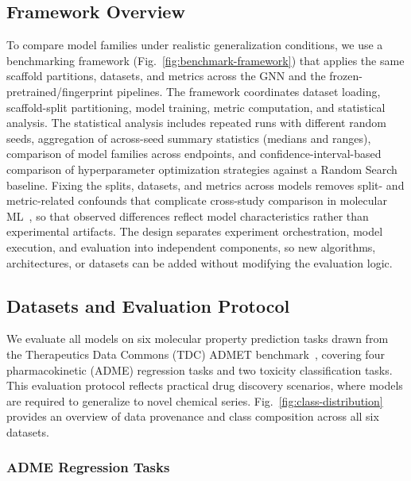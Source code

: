 \documentclass[journal]{IEEEtran}
\begin{document}
\subsection{Framework Overview}
\label{sec:framework}

To compare model families under realistic generalization conditions, we use a benchmarking framework (Fig.~\ref{fig:benchmark-framework}) that applies the same scaffold partitions, datasets, and metrics across the GNN and the frozen-pretrained/fingerprint pipelines. The framework coordinates dataset loading, scaffold-split partitioning, model training, metric computation, and statistical analysis.
The statistical analysis includes repeated runs with different random seeds, aggregation of across-seed summary statistics (medians and ranges), comparison of model families across endpoints, and confidence-interval-based comparison of hyperparameter optimization strategies against a Random Search baseline.
Fixing the splits, datasets, and metrics across models removes split- and metric-related confounds that complicate cross-study comparison in molecular ML~\cite{wu2018moleculenet}, so that observed differences reflect model characteristics rather than experimental artifacts. The design separates experiment orchestration, model execution, and evaluation into independent components, so new algorithms, architectures, or datasets can be added without modifying the evaluation logic.


\subsection{Datasets and Evaluation Protocol}
\label{sec:datasets}

We evaluate all models on six molecular property prediction tasks drawn from the Therapeutics Data Commons (TDC) ADMET benchmark~\cite{huang2021therapeuticsdatacommonsmachine}, covering four pharmacokinetic (ADME) regression tasks and two toxicity classification tasks. This evaluation protocol reflects practical drug discovery scenarios, where models are required to generalize to novel chemical series. Fig.~\ref{fig:class-distribution} provides an overview of data provenance and class composition across all six datasets.

\subsubsection{ADME Regression Tasks}
\end{document}
